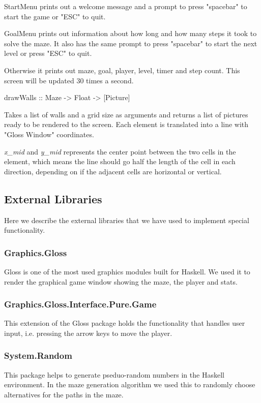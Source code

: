 \documentclass[12pt, a4paper]{article}
\begin{document}
StartMenu prints out a welcome message and a prompt to press "spacebar" to start the game or "ESC" to quit.
 
GoalMenu prints out information about how long and how many steps it took to solve the maze. It also has the same prompt to press "spacebar" to start the next level or press "ESC" to quit.
 
Otherwise it prints out maze, goal, player, level, timer and step count. This screen will be updated 30 times a second.


\begin{code}
drawWalls :: Maze -> Float -> [Picture]
\end{code}
Takes a list of walls and a grid size as arguments and returns a list of pictures ready to be rendered to the screen. Each element is translated into a line with "Gloss Window" coordinates. 

\textit{x\_mid} and \textit{y\_mid} represents the center point between the two cells in the element, which means the line should go half the length of the cell in each direction, depending on if the adjacent cells are horizontal or vertical.





\subsection{External Libraries}
Here we describe the external libraries that we have used to implement special functionality.


\subsubsection*{Graphics.Gloss}
Gloss is one of the most used graphics modules built for Haskell. We used it to render the graphical game window showing the maze, the player and stats.


\subsubsection*{Graphics.Gloss.Interface.Pure.Game}
This extension of the Gloss package holds the functionality that handles user input, i.e. pressing the arrow keys to move the player.


\subsubsection*{System.Random}
This package helps to generate pseduo-random numbers in the Haskell environment. In the maze generation algorithm we used this to randomly choose alternatives for the paths in the maze.\cite{System.Random}
\end{document}
